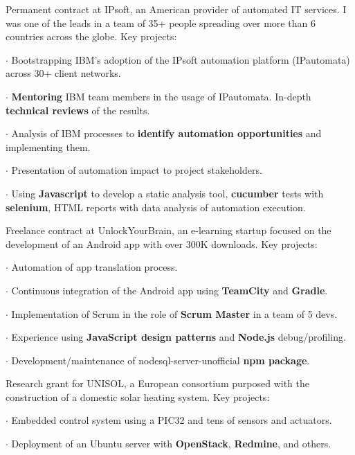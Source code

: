 {
Permanent contract at IPsoft, an American provider of automated IT services.  I
was one of the leads in a team of 35+ people spreading over more than 6
countries across the globe. Key projects:

$\cdot$ Bootstrapping IBM's adoption of the IPsoft automation platform (IPautomata) across 30+ client networks.

$\cdot$ \textbf{Mentoring} IBM team members in the usage of IPautomata. In-depth \textbf{technical reviews} of the results.

$\cdot$ Analysis of IBM processes to \textbf{identify automation opportunities} and implementing them.

$\cdot$ Presentation of automation impact to project stakeholders.

$\cdot$ Using \textbf{Javascript} to develop a static analysis tool, \textbf{cucumber} tests with \textbf{selenium}, HTML reports with data analysis of automation execution.
}

\vspace{\baselineskip}
{
Freelance contract at UnlockYourBrain, an e-learning startup focused on the development
of an Android app with over 300K downloads. Key projects:

$\cdot$  Automation of app translation process.

$\cdot$  Continuous integration of the Android app using \textbf{TeamCity} and \textbf{Gradle}.

$\cdot$  Implementation of Scrum in the role of \textbf{Scrum Master} in a team of 5 devs.

$\cdot$  Experience using \textbf{JavaScript design patterns} and \textbf{Node.js} debug/profiling.

$\cdot$  Development/maintenance of nodesql-server-unofficial \textbf{npm package}.
}

\vspace{\baselineskip}
{
Research grant for UNISOL, a European consortium purposed with the construction
of a domestic solar heating system. Key projects:

$\cdot$  Embedded control system using a PIC32 and tens of sensors and
actuators.

$\cdot$  Deployment of an Ubuntu server with \textbf{OpenStack}, \textbf{Redmine}, and others.
}

